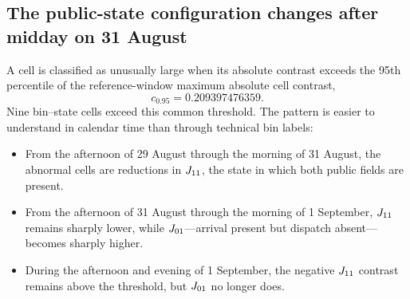 \documentclass[11pt]{article}
\begin{document}
\subsection{The public-state configuration changes after midday on 31 August}

A cell is classified as unusually large when its absolute contrast exceeds the 95th percentile of the reference-window maximum absolute cell contrast,
\begin{equation}
c_{0.95}=0.209397476359.
\end{equation}
Nine bin--state cells exceed this common threshold. The pattern is easier to understand in calendar time than through technical bin labels:

\begin{itemize}
\item From the afternoon of 29 August through the morning of 31 August, the abnormal cells are reductions in $J_{11}$, the state in which both public fields are present.
\item From the afternoon of 31 August through the morning of 1 September, $J_{11}$ remains sharply lower, while $J_{01}$---arrival present but dispatch absent---becomes sharply higher.
\item During the afternoon and evening of 1 September, the negative $J_{11}$ contrast remains above the threshold, but $J_{01}$ no longer does.
\end{itemize}
\end{document}
